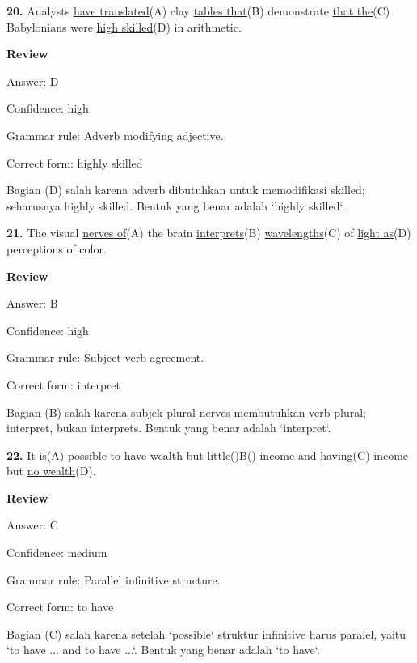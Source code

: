 \documentclass[12pt]{article}
\begin{document}
\endgroup
\par
\vspace{\questionblockgap}
\noindent\textbf{20.} Analysts \uline{have translated}(A) clay \uline{tables that}(B) demonstrate \uline{that the}(C) Babylonians were \uline{high skilled}(D) in arithmetic.
\par
\begingroup
\setlength{\parskip}{0pt}
\setlength{\parindent}{0pt}
\textbf{Review}\par
Answer: D\par
Confidence: high\par
Grammar rule: Adverb modifying adjective.\par
Correct form: highly skilled\par
Bagian (D) salah karena adverb dibutuhkan untuk memodifikasi skilled; seharusnya highly skilled. Bentuk yang benar adalah `highly skilled`.\par
\endgroup
\par
\vspace{\questionblockgap}
\noindent\textbf{21.} The visual \uline{nerves of}(A) the brain \uline{interprets}(B) \uline{wavelengths}(C) of \uline{light as}(D) perceptions of color.
\par
\begingroup
\setlength{\parskip}{0pt}
\setlength{\parindent}{0pt}
\textbf{Review}\par
Answer: B\par
Confidence: high\par
Grammar rule: Subject-verb agreement.\par
Correct form: interpret\par
Bagian (B) salah karena subjek plural nerves membutuhkan verb plural; interpret, bukan interprets. Bentuk yang benar adalah `interpret`.\par
\endgroup
\par
\vspace{\questionblockgap}
\noindent\textbf{22.} \uline{It is}(A) possible to have wealth but \uline{little()B}() income and \uline{having}(C) income but \uline{no wealth}(D).
\par
\begingroup
\setlength{\parskip}{0pt}
\setlength{\parindent}{0pt}
\textbf{Review}\par
Answer: C\par
Confidence: medium\par
Grammar rule: Parallel infinitive structure.\par
Correct form: to have\par
Bagian (C) salah karena setelah `possible` struktur infinitive harus paralel, yaitu `to have ... and to have ...`. Bentuk yang benar adalah `to have`.\par
\end{document}

